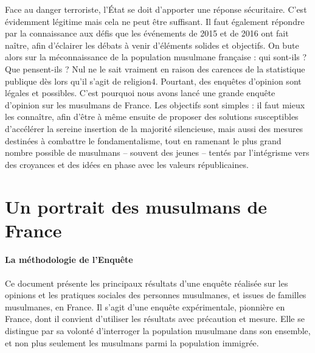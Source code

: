 Face au danger terroriste, l'État se doit d'apporter une réponse
sécuritaire. C'est évidemment légitime mais cela ne peut être suffisant.
Il faut également répondre par la connaissance aux défis que les
événements de 2015 et de 2016 ont fait naître, afin d'éclairer les
débats à venir d'éléments solides et objectifs. On bute alors sur la
méconnaissance de la population musulmane française : qui sont-ils ? Que
pensent-ils ? Nul ne le sait vraiment en raison des carences de la
statistique publique dès lors qu'il s'agit de religion4. Pourtant, des
enquêtes d'opinion sont légales et possibles. C'est pourquoi nous avons
lancé une grande enquête d'opinion sur les musulmans de France. Les
objectifs sont simples : il faut mieux les connaître, afin d'être à même
ensuite de proposer des solutions susceptibles d'accélérer la sereine
insertion de la majorité silencieuse, mais aussi des mesures destinées à
combattre le fondamentalisme, tout en ramenant le plus grand nombre
possible de musulmans -- souvent des jeunes -- tentés par l'intégrisme
vers des croyances et des idées en phase avec les valeurs républicaines.



\section{Un portrait des musulmans de France}


\paragraph{La méthodologie de l'Enquête}

Ce document présente les principaux résultats d'une enquête réalisée
sur les opinions et les pratiques sociales des personnes musulmanes, et
issues de familles musulmanes, en France. Il s'agit d'une enquête
expérimentale, pionnière en France, dont il convient d'utiliser les
résultats avec précaution et mesure. Elle se distingue par sa volonté
d'interroger la population musulmane dans son ensemble, et non plus
seulement les musulmans parmi la population immigrée.

